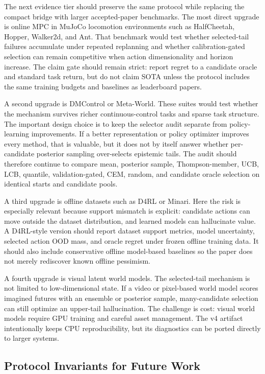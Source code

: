 \documentclass{article}
\begin{document}
The next evidence tier should preserve the same protocol while replacing the
compact bridge with larger accepted-paper benchmarks. The most direct upgrade
is online MPC in MuJoCo locomotion environments such as HalfCheetah, Hopper,
Walker2d, and Ant. That benchmark would test whether selected-tail failures
accumulate under repeated replanning and whether calibration-gated selection
can remain competitive when action dimensionality and horizon increase. The
claim gate should remain strict: report regret to a candidate oracle and
standard task return, but do not claim SOTA unless the protocol includes the
same training budgets and baselines as leaderboard papers.

A second upgrade is DMControl or Meta-World. These suites would test whether
the mechanism survives richer continuous-control tasks and sparse task
structure. The important design choice is to keep the selector audit separate
from policy-learning improvements. If a better representation or policy
optimizer improves every method, that is valuable, but it does not by itself
answer whether per-candidate posterior sampling over-selects epistemic tails.
The audit should therefore continue to compare mean, posterior sample,
Thompson-member, UCB, LCB, quantile, validation-gated, CEM, random, and
candidate oracle selection on identical starts and candidate pools.

A third upgrade is offline datasets such as D4RL or Minari. Here the risk is
especially relevant because support mismatch is explicit: candidate actions can
move outside the dataset distribution, and learned models can hallucinate
value. A D4RL-style version should report dataset support metrics, model
uncertainty, selected action OOD mass, and oracle regret under frozen offline
training data. It should also include conservative offline model-based
baselines so the paper does not merely rediscover known offline pessimism.

A fourth upgrade is visual latent world models. The selected-tail mechanism is
not limited to low-dimensional state. If a video or pixel-based world model
scores imagined futures with an ensemble or posterior sample, many-candidate
selection can still optimize an upper-tail hallucination. The challenge is
cost: visual world models require GPU training and careful asset management.
The v4 artifact intentionally keeps CPU reproducibility, but its diagnostics
can be ported directly to larger systems.

\subsection{Protocol Invariants for Future Work}
\end{document}
